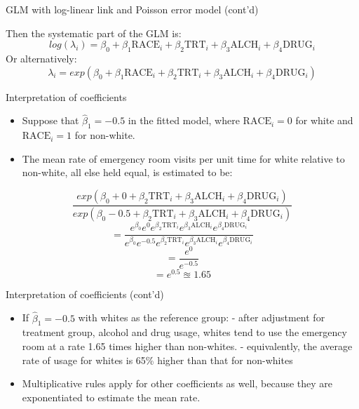 \documentclass[
  ignorenonframetext,
]{beamer}
\providecommand{\tightlist}{%
  \setlength{\itemsep}{0pt}\setlength{\parskip}{0pt}}
\begin{document}
\begin{frame}{GLM with log-linear link and Poisson error model (cont'd)}
\protect\hypertarget{glm-with-log-linear-link-and-poisson-error-model-contd}{}

Then the systematic part of the GLM is: \[
log(\lambda_i) = \beta_0 + \beta_1 \textrm{RACE}_i + \beta_2 \textrm{TRT}_i + \beta_3 \textrm{ALCH}_i + \beta_4 \textrm{DRUG}_i
\] Or alternatively: \[
\lambda_i = exp \left( \beta_0 + \beta_1 \textrm{RACE}_i + \beta_2 \textrm{TRT}_i + \beta_3 \textrm{ALCH}_i + \beta_4 \textrm{DRUG}_i \right)
\]

\end{frame}

\begin{frame}{Interpretation of coefficients}
\protect\hypertarget{interpretation-of-coefficients}{}

\begin{itemize}
\tightlist
\item
  Suppose that \(\hat \beta_1 = -0.5\) in the fitted model, where
  \(\textrm{RACE}_i=0\) for white and \(\textrm{RACE}_i=1\) for
  non-white.
\item
  The mean rate of emergency room visits per unit time for white
  relative to non-white, all else held equal, is estimated to be:
\end{itemize}

\[
\frac{exp \left( \beta_0 + 0 + \beta_2 \textrm{TRT}_i + \beta_3 \textrm{ALCH}_i + \beta_4 \textrm{DRUG}_i \right)}{exp \left( \beta_0 - 0.5 + \beta_2 \textrm{TRT}_i + \beta_3 \textrm{ALCH}_i + \beta_4 \textrm{DRUG}_i \right)}
\] \[
= \frac{e^{\beta_0} e^0 e^{\beta_2 \textrm{TRT}_i} e^{\beta_3 \textrm{ALCH}_i} e^{\beta_4 \textrm{DRUG}_i}}
{e^{\beta_0} e^{-0.5} e^{\beta_2 \textrm{TRT}_i} e^{\beta_3 \textrm{ALCH}_i} e^{\beta_4 \textrm{DRUG}_i}}
\] \[
= \frac{e^0}{e^{-0.5}}
\] \[
= e^{0.5} \approxeq 1.65
\]

\end{frame}

\begin{frame}{Interpretation of coefficients (cont'd)}
\protect\hypertarget{interpretation-of-coefficients-contd}{}

\begin{itemize}
\tightlist
\item
  If \(\hat \beta_1=-0.5\) with whites as the reference group: - after
  adjustment for treatment group, alcohol and drug usage, whites tend to
  use the emergency room at a rate 1.65 times higher than non-whites. -
  equivalently, the average rate of usage for whites is 65\% higher than
  that for non-whites
\item
  Multiplicative rules apply for other coefficients as well, because
  they are exponentiated to estimate the mean rate.
\end{itemize}

\end{frame}
\end{document}
